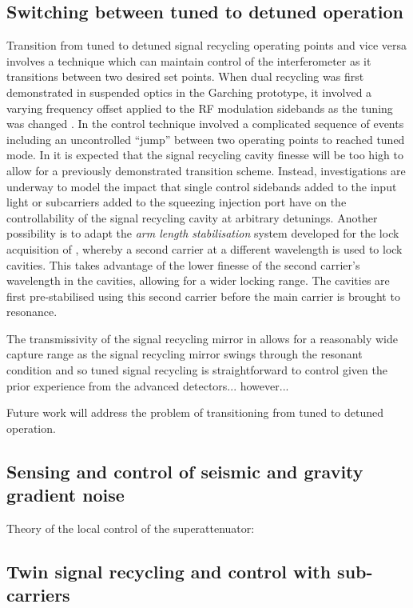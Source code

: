 \subsection{Switching between tuned to detuned operation}
Transition from tuned to detuned signal recycling operating points and vice versa involves a technique which can maintain control of the interferometer as it transitions between two desired set points. When dual recycling was first demonstrated in suspended optics in the Garching prototype, it involved a varying frequency offset applied to the \gls{RF} modulation sidebands as the tuning was changed \cite{Freise2000}. In \GEO{} the control technique involved a complicated sequence of events \cite{Grote2004} including an uncontrolled ``jump'' between two operating points \cite{Hild2007} to reached tuned mode. In \ETLF{} it is expected that the signal recycling cavity finesse will be too high to allow for a previously demonstrated transition scheme. Instead, investigations are underway to model the impact that single control sidebands added to the input light or subcarriers added to the squeezing injection port have on the controllability of the signal recycling cavity at arbitrary detunings. Another possibility is to adapt the \emph{arm length stabilisation} system developed for the lock acquisition of \ALIGO{} \cite{Mullavey2012, Staley2014}, whereby a second carrier at a different wavelength is used to lock cavities. This takes advantage of the lower finesse of the second carrier's wavelength in the cavities, allowing for a wider locking range. The cavities are first pre-stabilised using this second carrier before the main carrier is brought to resonance.

The transmissivity of the signal recycling mirror in \ETLF{} allows for a reasonably wide capture range as the signal recycling mirror swings through the resonant condition and so tuned signal recycling is straightforward to control given the prior experience from the advanced detectors... however...

Future work will address the problem of transitioning \ETLF{} from tuned to detuned operation.

\subsection{Sensing and control of seismic and gravity gradient noise}

Theory of the local control of the superattenuator: \cite{Acernese2004}

\subsection{Twin signal recycling and control with sub-carriers}